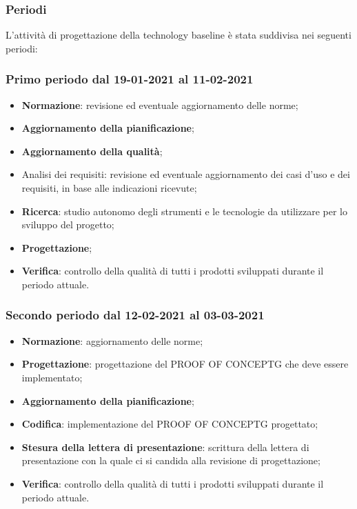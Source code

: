 \documentclass[]{article}
\begin{document}
	\subsubsection{Periodi}
	L’attività di progettazione della technology baseline è stata suddivisa nei seguenti periodi:
	
	\subsubsection{Primo periodo dal 19-01-2021 al 11-02-2021}
	\begin{itemize}
	\item \textbf{Normazione}: revisione ed eventuale aggiornamento delle norme;
	\item \textbf{Aggiornamento della pianificazione};
	\item \textbf{Aggiornamento della qualità};
	\item {Analisi dei requisiti}: revisione ed eventuale aggiornamento dei casi d’uso e dei requisiti, in base
	alle indicazioni ricevute;
	\item \textbf{Ricerca}: studio autonomo degli strumenti e le tecnologie da utilizzare per lo sviluppo del
	progetto;
	\item \textbf{Progettazione};
	\item \textbf{Verifica}: controllo della qualità di tutti i prodotti sviluppati durante il periodo attuale.
	\end{itemize}

	\subsubsection{Secondo periodo dal 12-02-2021 al 03-03-2021}
	\begin{itemize}
	\item \textbf{Normazione}: aggiornamento delle norme;
	\item \textbf{Progettazione}: progettazione del PROOF OF CONCEPTG che deve essere implementato;
	\item \textbf{Aggiornamento della pianificazione};
	\item \textbf{Codifica}: implementazione del PROOF OF CONCEPTG progettato;
	\item \textbf{Stesura della lettera di presentazione}: scrittura della lettera di presentazione con la quale ci
	si candida alla revisione di progettazione;
	\item \textbf{Verifica}: controllo della qualità di tutti i prodotti sviluppati durante il periodo attuale.
	\end{itemize}	
	
\end{document}
